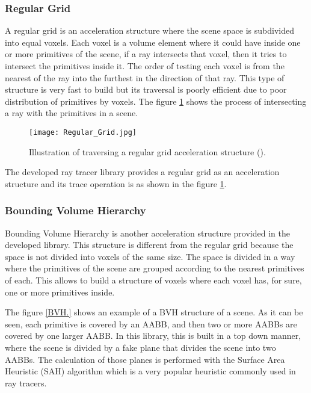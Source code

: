\subsubsection{Regular Grid}

\par
A regular grid is an acceleration structure where the scene space is subdivided into equal voxels.
Each voxel is a volume element where it could have inside one or more primitives of the scene, if a ray intersects that voxel, then it tries to intersect the primitives inside it.
The order of testing each voxel is from the nearest of the ray into the furthest in the direction of that ray.
This type of structure is very fast to build but its traversal is poorly efficient due to poor distribution of primitives by voxels.
The figure \ref{RegularGrid.} shows the process of intersecting a ray with the primitives in a scene.

\begin{figure}[H]
	\centering
	\caption{Illustration of traversing a regular grid acceleration structure (\cite{RegularGrid}).}
	\label{RegularGrid.}
	\texttt{[image: Regular\_Grid.jpg]}
\end{figure}

\par
The developed ray tracer library provides a regular grid as an acceleration structure and its trace operation is as shown in the figure \ref{RegularGrid.}.

\subsubsection{Bounding Volume Hierarchy}

\par
Bounding Volume Hierarchy is another acceleration structure provided in the developed library.
This structure is different from the regular grid because the space is not divided into voxels of the same size.
The space is divided in a way where the primitives of the scene are grouped according to the nearest primitives of each.
This allows to build a structure of voxels where each voxel has, for sure, one or more primitives inside.

\par
The figure \ref{BVH.} shows an example of a BVH structure of a scene.
As it can be seen, each primitive is covered by an AABB, and then two or more AABBs are covered by one larger AABB.
In this library, this is built in a top down manner, where the scene is divided by a fake plane that divides the scene into two AABBs.
The calculation of those planes is performed with the Surface Area Heuristic (SAH) algorithm which is a very popular heuristic commonly used in ray tracers.

